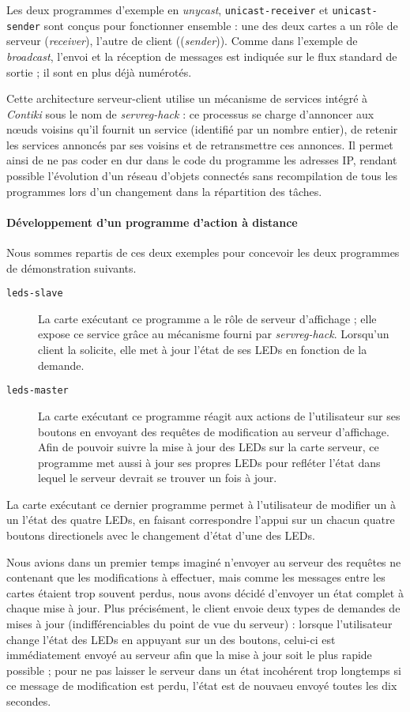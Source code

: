 Les deux programmes d’exemple en \textit{unycast}, \texttt{unicast-receiver} et \texttt{unicast-sender} sont conçus pour fonctionner ensemble : une des deux cartes a un rôle de serveur (\textit{receiver}), l’autre de client ((\textit{sender})).
Comme dans l’exemple de \textit{broadcast}, l’envoi et la réception de messages est indiquée sur le flux standard de sortie ; il sont en plus déjà numérotés.

Cette architecture serveur-client utilise un mécanisme de services intégré à \emph{Contiki} sous le nom de \emph{servreg-hack} : ce processus se charge d’annoncer aux nœuds voisins qu’il fournit un service (identifié par un nombre entier), de retenir les services annoncés par ses voisins et de retransmettre ces annonces.
Il permet ainsi de ne pas coder en dur dans le code du programme les adresses IP, rendant possible l’évolution d’un réseau d’objets connectés sans recompilation de tous les programmes lors d’un changement dans la répartition des tâches.

\paragraph{Développement d’un programme d’action à distance}

Nous sommes repartis de ces deux exemples pour concevoir les deux programmes de démonstration suivants.

\begin{description}
	\item[\texttt{leds-slave}]
		La carte exécutant ce programme a le rôle de serveur d’affichage ; elle expose ce service grâce au mécanisme fourni par \emph{servreg-hack}.
		Lorsqu’un client la solicite, elle met à jour l’état de ses LEDs en fonction de la demande.
	\item[\texttt{leds-master}]
		La carte exécutant ce programme réagit aux actions de l’utilisateur sur ses boutons en envoyant des requêtes de modification au serveur d’affichage.
		Afin de pouvoir suivre la mise à jour des LEDs sur la carte serveur, ce programme met aussi à jour ses propres LEDs pour refléter l’état dans lequel le serveur devrait se trouver un fois à jour.
\end{description}

La carte exécutant ce dernier programme permet à l’utilisateur de modifier un à un l’état des quatre LEDs, en faisant correspondre l’appui sur un chacun quatre boutons directionels avec le changement d’état d’une des LEDs.

Nous avions dans un premier temps imaginé n’envoyer au serveur des requêtes ne contenant que les modifications à effectuer, mais comme les messages entre les cartes étaient trop souvent perdus, nous avons décidé d’envoyer un état complet à chaque mise à jour.
Plus précisément, le client envoie deux types de demandes de mises à jour (indifférenciables du point de vue du serveur) : lorsque l’utilisateur change l’état des LEDs en appuyant sur un des boutons, celui-ci est immédiatement envoyé au serveur afin que la mise à jour soit le plus rapide possible ; pour ne pas laisser le serveur dans un état incohérent trop longtemps si ce message de modification est perdu, l’état est de nouvaeu envoyé toutes les dix secondes.

